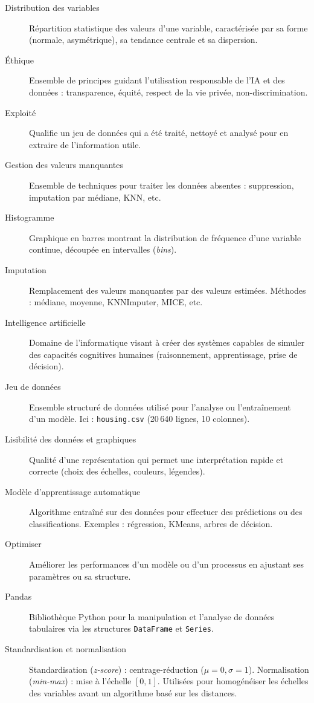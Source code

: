 \documentclass[11pt,a4paper]{article}
\begin{document}
\begin{description}
    \item[Distribution des variables] Répartition statistique des valeurs d'une variable, caractérisée par sa forme (normale, asymétrique), sa tendance centrale et sa dispersion.
    \item[Éthique] Ensemble de principes guidant l'utilisation responsable de l'IA et des données : transparence, équité, respect de la vie privée, non-discrimination.
    \item[Exploité] Qualifie un jeu de données qui a été traité, nettoyé et analysé pour en extraire de l'information utile.
    \item[Gestion des valeurs manquantes] Ensemble de techniques pour traiter les données absentes : suppression, imputation par médiane, KNN, etc.
    \item[Histogramme] Graphique en barres montrant la distribution de fréquence d'une variable continue, découpée en intervalles (\textit{bins}).
    \item[Imputation] Remplacement des valeurs manquantes par des valeurs estimées. Méthodes : médiane, moyenne, KNNImputer, MICE, etc.
    \item[Intelligence artificielle] Domaine de l'informatique visant à créer des systèmes capables de simuler des capacités cognitives humaines (raisonnement, apprentissage, prise de décision).
    \item[Jeu de données] Ensemble structuré de données utilisé pour l'analyse ou l'entraînement d'un modèle. Ici : \texttt{housing.csv} (20\,640 lignes, 10 colonnes).
    \item[Lisibilité des données et graphiques] Qualité d'une représentation qui permet une interprétation rapide et correcte (choix des échelles, couleurs, légendes).
    \item[Modèle d'apprentissage automatique] Algorithme entraîné sur des données pour effectuer des prédictions ou des classifications. Exemples : régression, KMeans, arbres de décision.
    \item[Optimiser] Améliorer les performances d'un modèle ou d'un processus en ajustant ses paramètres ou sa structure.
    \item[Pandas] Bibliothèque Python pour la manipulation et l'analyse de données tabulaires via les structures \texttt{DataFrame} et \texttt{Series}.
    \item[Standardisation et normalisation] Standardisation (\textit{z-score}) : centrage-réduction ($\mu=0, \sigma=1$). Normalisation (\textit{min-max}) : mise à l'échelle $[0, 1]$. Utilisées pour homogénéiser les échelles des variables avant un algorithme basé sur les distances.

\end{description}
\end{document}
